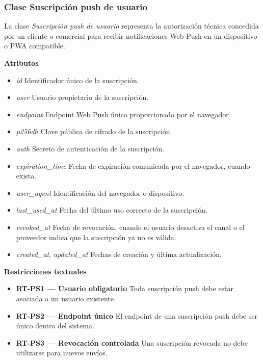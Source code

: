 \subsubsection{Clase Suscripción push de usuario}

La clase \textit{Suscripción push de usuario} representa la autorización técnica concedida por un cliente o comercial para recibir notificaciones Web Push en un dispositivo o PWA compatible.

\textbf{Atributos}

\begin{itemize}

      \item \textit{id}
            Identificador único de la suscripción.
      \item \textit{user}
            Usuario propietario de la suscripción.
      \item \textit{endpoint}
            Endpoint Web Push único proporcionado por el navegador.
      \item \textit{p256dh}
            Clave pública de cifrado de la suscripción.
      \item \textit{auth}
            Secreto de autenticación de la suscripción.
      \item \textit{expiration\_time}
            Fecha de expiración comunicada por el navegador, cuando exista.
      \item \textit{user\_agent}
            Identificación del navegador o dispositivo.
      \item \textit{last\_used\_at}
            Fecha del último uso correcto de la suscripción.
      \item \textit{revoked\_at}
            Fecha de revocación, cuando el usuario desactiva el canal o el proveedor indica que la suscripción ya no es válida.
      \item \textit{created\_at}, \textit{updated\_at}
            Fechas de creación y última actualización.

\end{itemize}

\textbf{Restricciones textuales}

\begin{itemize}

      \item \textbf{RT-PS1 — Usuario obligatorio}
            Toda suscripción push debe estar asociada a un usuario existente.
      \item \textbf{RT-PS2 — Endpoint único}
            El endpoint de una suscripción push debe ser único dentro del sistema.
      \item \textbf{RT-PS3 — Revocación controlada}
            Una suscripción revocada no debe utilizarse para nuevos envíos.

\end{itemize}

